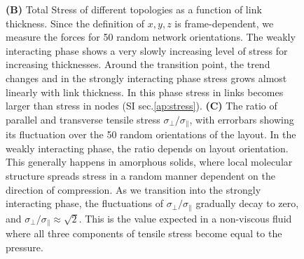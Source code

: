 \documentclass[nofootinbib,preprint,floatfix,titlepage,endfloats,superscriptaddress]{revtex4} %
\begin{document}
\begin{figure}
{    {\bf (B)} Total Stress of different topologies as a function of link thickness. Since the definition of $x,y,z$ is frame-dependent, we measure the forces for 50 random network orientations. 
    The weakly interacting phase shows a very slowly increasing level of stress for increasing thicknesses. %
    Around the transition point, the trend changes and in the strongly interacting phase stress grows almost linearly with link thickness. 
    In this phase stress in links becomes larger than stress in nodes (SI sec.\ref{ap:stress}). 
    {\bf (C)} The ratio of parallel and transverse tensile stress $\sigma_\perp/\sigma_\parallel$, with errorbars showing its fluctuation over the 50 random orientations of the layout. 
    In the weakly interacting phase, the ratio depends on layout orientation. This generally happens in amorphous solids, where local molecular structure spreads stress in a random manner dependent on the direction of compression. 
    As we transition into the strongly interacting phase, the fluctuations of $\sigma_\perp/\sigma_\parallel$ gradually decay to zero, and $\sigma_\perp/\sigma_\parallel \approx \sqrt{2}$. 
    This is the value expected in a non-viscous fluid where all three components of tensile stress become equal to the pressure.}
    \label{fig:stress}
\end{figure}
\end{document}
